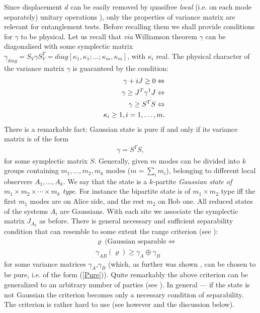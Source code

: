 \documentclass[twocolumn,aps,rmp]{revtex4}
\begin{document}
Since displacement $d$ can be easily removed by quasifree {\it
local} (i.e. on each mode separately) unitary operations
\cite{DuanGCZ1999-criterion}), only the properties of variance matrix are
relevant for entanglement tests. Before recalling them we shall
provide conditions for $\gamma$ to be physical. Let us recall that
{\it via} Williamson theorem $\gamma$ can be diagonalised with some
symplectic matrix $\gamma_{diag}=S_{V}\gamma
S_{V}^{T}=diag[\kappa_{1},\kappa_{1};\ldots;\kappa_{m},\kappa_{m}]$,
with $\kappa_{i}$ real. The physical character of the variance
matrix $\gamma$ is guaranteed by the condition:
\begin{eqnarray}
&&\gamma+iJ\geq 0\Leftrightarrow \\
\label{1}
&&\gamma\geq J^{T}\gamma^{\-1}J \Leftrightarrow \\
\label{2}
&&\gamma\geq S^{T}S \Leftrightarrow \\
\label{3}
&&\kappa_{i}\geq 1, i=1,\ldots,m.
\label{4}
\end{eqnarray}
There is a remarkable fact\cite{Simon}:
Gaussian state is pure if and only if its variance matrix is of the form
\begin{eqnarray}
\gamma=S^{T}S,
\label{Pure}
\end{eqnarray}
for some symplectic matrix $S$. Generally, given $m$ modes
can be divided into $k$ groups containing $m_{1},\ldots,m_{2},m_{k}$
modes ($m=\sum_{i}m_{i}$), belonging to different local observers
$A_{1},\ldots,A_{k}$. We say that the state is a $k$-partite {\it
Gaussian state of $m_{1} \times m_{2} \times \cdots \times m_{k}$
type}. For instance the bipartite state is  of $m_{1} \times m_{2}$
type iff the first $m_{1}$ modes are on Alice side, and the rest
$m_{2}$ on Bob one. All reduced states of the systems $A_{i}$ are
Gaussians. With each site we associate the symplectic matrix
$J_{A_{k}}$ as before. There is general necessary and sufficient
separability condition that can resemble to some extent the range
criterion (see \cite{WernerWolf}):
\begin{eqnarray}
&&\varrho \ (\text{Gaussian separable} \Leftrightarrow \\
&&\gamma_{AB}(\varrho) \geq \gamma_{A} \oplus \gamma_{B}
\label{GaussMajor}
\end{eqnarray}
for some variance matrices $\gamma_{A}$,$\gamma_{B}$ (which, as
further was shown \cite{Simon1}, can be chosen to be pure, i.e. of the
form (\ref{Pure})). Quite remarkably the above criterion can be
generalized to an arbitrary number of parties (see \cite{Eisert}).  In
general --- if the state is not Gaussian the criterion becomes only a
necessary condition of separability. The criterion is rather hard to
use (see however \cite{WernerWolf} and the discussion below).
\end{document}
